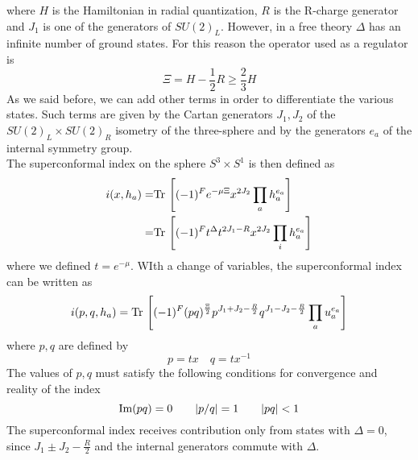 where $H$ is the Hamiltonian in radial quantization, $R$ is the R-charge generator and $J_1$ is one of the generators of $SU(2)_L$. 
 However, in a free theory $\Delta$ has an infinite number of ground states. 
 For this reason the operator used as a regulator is \cite{Romelsberger:2005eg}
 \begin{equation}
 	\Xi = H - \frac{1}{2} R \geq \frac{2}{3} H 
 \end{equation}
As we said before, we can add other terms in order to differentiate the various states.
Such terms are given by the Cartan generators $J_1, J_2$ of the $SU(2)_L \times SU(2)_R$ isometry of the three-sphere and by the generators $e_a$ of the internal symmetry group.\\
The superconformal index on the sphere $S^3 \times S^1$ is then defined as \cite{Romelsberger:2007ec}
\begin{align}
 i( x, h_a) =&
\mathrm{Tr } \, \left[ (-1)^F  e^{ - \mu \Xi} x^{2 J_2} \prod_a h_a^{e_a} \right] \\= &
\mathrm{Tr } \, \left[ (-1)^F  t^{\Delta} t^{ 2 J_1 - R} x^{2 J_2} \prod_i h_a^{e_a} \right] 
 \end{align} 
 where we defined $t = e^{- \mu}$.
WIth a change of variables, the superconformal index can be written as 
\begin{equation}
 i( p, q, h_a) =
 \Tr  \left[  (-1)^F 
 (pq)^{ \frac{\Xi}{2}} %
  p^{J_1 + J_2 - \frac{R}{2}} q^{J_1 - J_2 - \frac{R}{2} } \prod_a u_a^{e_a}    \right]
\end{equation}
where $p,q$ are defined by
\begin{equation}
p = t x \quad q = t x^{-1}
\end{equation}
The values of $p,q$ must satisfy the following conditions for convergence and reality of the index
\begin{equation}
\hbox{Im} (pq) =0 \qquad |p/q| =  1 \qquad | pq| < 1
\label{eqn:reality_convergence_condition_index}
\end{equation}
The superconformal index receives contribution only from states with $\Delta=0$, since $J_1 \pm J_2 - \frac{R}{2}$ and the internal generators commute with $\Delta$.

